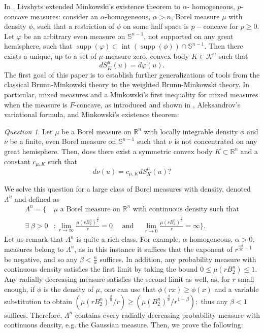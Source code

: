 \documentclass[11pt]{amsart}
\theoremstyle{definition}
\theoremstyle{remark}
\newtheorem{question}[theorem]{Question}
\numberwithin{equation}{section}
\newcommand{\R}{\mathbb{R}}
\newcommand{\s}{\mathbb{S}}
\newcommand{\conbod}{\mathcal{K}^n}
\begin{document}
In \cite{GAL19}, Livshyts extended Minkowski's existence theorem to $\alpha$- homogeneous, $p$-concave measures: consider an $\alpha$-homogeneous, $\alpha>n$, Borel measure $\mu$ with density $\phi$, such that a restriction of $\phi$ on some half space is $p-$concave for $p \geq 0 .$ Let $\varphi$ be an arbitrary even measure on $\s^{n-1}$, not supported on any great hemisphere, such that $\operatorname{supp}(\varphi) \subset \operatorname{int}(\operatorname{supp}(\phi)) \cap \s^{n-1}$. Then there exists a unique, up to a set of $\mu$-measure zero, convex body $K\in\conbod$ such that
$$
dS^{\mu}_{K}(u)=d \varphi(u).
$$
The first goal of this paper is to establish further generalizations of tools from the classical Brunn-Minkowski theory to the weighted Brunn-Minkowski theory. In particular, mixed measures and a Minkowski's first inequality for mixed measures when the measure is $F$-concave, as introduced and shown in \cite{GAL19}, Aleksandrov's variational formula, and Minkowski's existence theorem:
\begin{question}
\label{q:min_exs}
Let $\mu$ be a Borel measure on $\R^n$ with locally integrable density $\phi$ and $\nu$ be a finite, even Borel measure on $\s^{n-1}$ such that $\nu$ is not concentrated on any great hemisphere. Then, does there exist a symmetric convex body $K\subset \R^n$ and a constant $c_{\mu,K}$ such that
$$d\nu(u)=c_{\mu,K}dS^{\mu}_{K}(u)?$$
\end{question}
We solve this question for a large class of Borel measures with density, denoted $\Lambda^n$ and defined as \begin{equation}
    \label{eq:lambda_prime}
    \begin{split}
    \Lambda^n=\bigg\{&\text{$\mu$ a Borel measure on $\R^n$ with continuous density such that}
    \\
    \exists \; \beta >0 &: \lim_{r\to\infty}\frac{\mu(rB_2^n)^\frac{\beta}{n}}{r} =0 \quad \text{ and } \quad \lim_{r\to 0}\frac{\mu(rB_2^n)^\frac{\beta}{n}}{r} =\infty \bigg\}.
    \end{split}
\end{equation}
Let us remark that $\Lambda^n$ is quite a rich class. For example, $\alpha$-homogeneous, $\alpha>0$, measures belong to $\Lambda^n$, as in this instance it suffices that the exponent of $r^{\frac{\alpha\beta}{n}-1}$ be negative, and so any $\beta <\frac{n}{\alpha}$ suffices. In addition, any probability measure with continuous density satisfies the first limit by taking the bound $0\leq \mu(rB_2^n)\leq 1$. Any radially decreasing measure satisfies the second limit as well, as, for $r$ small enough, if $\phi$ is the density of $\mu$, one can use that $\phi(rx)\geq \phi(x)$ and a variable substitution to obtain $\left(\mu(rB_2^n)^\frac{\beta}{n}/r\right)\geq \left(\mu(B_2^n)^\frac{\beta}{n}/r^{1-\beta}\right);$ thus any $\beta <1$ suffices. Therefore, $\Lambda^n$ contains every radially decreasing probability measure with continuous density, e.g. the Gaussian measure. Then, we prove the following:
\end{document}
